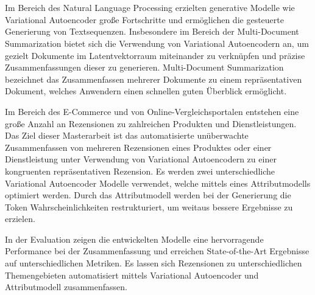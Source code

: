 \section*{}
Im Bereich des Natural Language Processing erzielten generative Modelle wie Variational Autoencoder große Fortschritte und ermöglichen die gesteuerte Generierung von Textsequenzen.
Insbesondere im Bereich der Multi-Document Summarization bietet sich die Verwendung von Variational Autoencodern an, um gezielt Dokumente im Latentvektorraum miteinander zu verknüpfen und präzise Zusammenfassungen dieser zu generieren.
Multi-Document Summarization bezeichnet das Zusammenfassen mehrerer Dokumente zu einem repräsentativen Dokument, welches Anwendern einen schnellen guten Überblick ermöglicht.

Im Bereich des E-Commerce und von Online-Vergleichsportalen entstehen eine große Anzahl an Rezensionen zu zahlreichen Produkten und Dienstleistungen.
Das Ziel dieser Masterarbeit ist das automatisierte unüberwachte Zusammenfassen von mehreren Rezensionen eines Produktes oder einer Dienstleistung unter Verwendung von Variational Autoencodern zu einer kongruenten repräsentativen Rezension.
Es werden zwei unterschiedliche Variational Autoencoder Modelle verwendet, welche mittels eines Attributmodells optimiert werden.
Durch das Attributmodell werden bei der Generierung die Token Wahrscheinlichkeiten restrukturiert, um weitaus bessere Ergebnisse zu erzielen.

In der Evaluation zeigen die entwickelten Modelle eine hervorragende Performance bei der Zusammenfassung und erreichen State-of-the-Art Ergebnisse auf unterschiedlichen Metriken.
Es lassen sich Rezensionen zu unterschiedlichen Themengebieten automatisiert mittels Variational Autoencoder und Attributmodell zusammenfassen.


